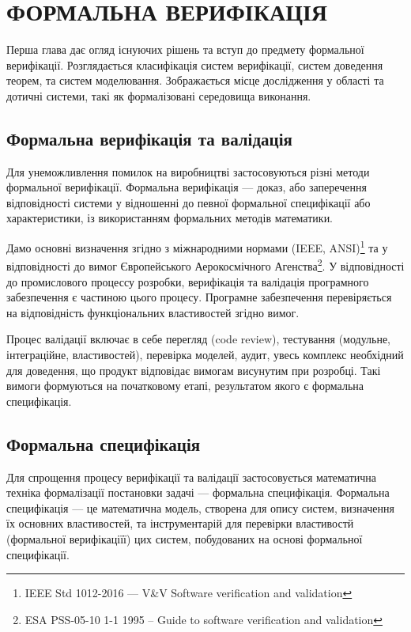\chapter{ФОРМАЛЬНА ВЕРИФІКАЦІЯ}

Перша глава дає огляд існуючих рішень та вступ до предмету формальної верифікації.
Розглядається класифікація систем верифікації, систем доведення теорем, та систем
моделювання. Зображається місце дослідження у області та дотичні системи, такі як
формалізовані середовища виконання.

\section{Формальна верифікація та валідація}
Для унеможливлення помилок на виробництві застосовуються різні
методи формальної верифікації. Формальна верифікація — доказ, або заперечення
відповідності системи у відношенні до певної формальної специфікації або характеристики,
із використанням формальних методів математики.

Дамо основні визначення згідно з міжнародними нормами (IEEE, ANSI)\footnote{IEEE Std 1012-2016  --- V\&V Software verification and validation} та у відповідності до вимог
Європейського Аерокосмічного Агенства\footnote{ESA PSS-05-10 1-1 1995 -- Guide to software verification and validation}.
У відповідності до промислового процессу розробки, верифікація та валідація програмного
забезпечення є частиною цього процесу. Програмне забезпечення перевіряється на
відповідність функціональних властивостей згідно вимог.

Процес валідації включає в себе перегляд (code review),
тестування (модульне, інтеграційне, властивостей), перевірка моделей, аудит,
увесь комплекс необхідний для доведення, що продукт відповідає вимогам
висунутим при розробці. Такі вимоги формуються на початковому етапі,
результатом якого є формальна специфікація.

\section{Формальна специфікація}
Для спрощення процесу верифікації та валідації
застосовується математична техніка формалізації постановки задачі --- формальна специфікація.
Формальна специфікація --- це математична модель, створена для опису систем,
визначення їх основних властивостей, та інструментарій для перевірки
властивостй (формальної верифікаціїї) цих систем, побудованих на основі формальної специфікації.

